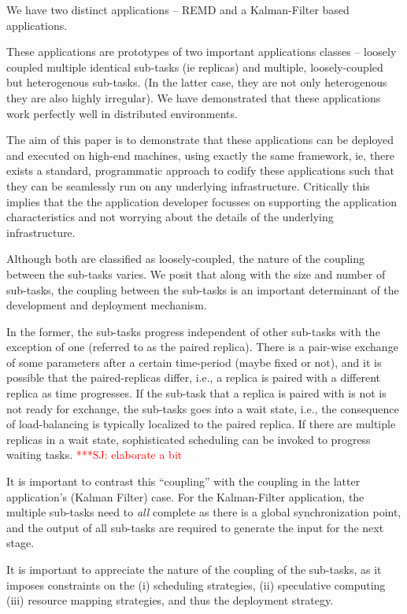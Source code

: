 \documentclass[conference,final]{IEEEtran}
\newcommand{\jhanote}[1]{ {\textcolor{red} { ***SJ: #1 }}}
\newcommand{\jhanote}[1]{}
\begin{document}
We have two distinct applications -- REMD and a Kalman-Filter based
applications.

These applications are prototypes of two important applications
classes -- loosely coupled multiple identical sub-tasks (ie replicas)
and multiple, loosely-coupled but heterogenous sub-tasks.  (In the
latter case, they are not only heterogenous they are also highly
irregular).  We have demonstrated that these applications work
perfectly well in distributed environments.

The aim of this paper is to demonstrate that these applications can be
deployed and executed on high-end machines, using exactly the same
framework, ie, there exists a standard, programmatic approach to
codify these applications such that they can be seamlessly run on any
underlying infrastructure. Critically this implies that the the
application developer focusses on supporting the application
characteristics and not worrying about the details of the underlying
infrastructure.

Although both are classified as loosely-coupled, the nature of the
coupling between the sub-tasks varies. We posit that along with the
size and number of sub-tasks, the coupling between the sub-tasks is an
important determinant of the development and deployment mechanism.

In the former, the sub-tasks
progress independent of other sub-tasks with the exception of one
(referred to as the paired replica). There is a pair-wise exchange of
some parameters after a certain time-period (maybe fixed or not), and
it is possible that the paired-replicas differ, i.e., a replica is
paired with a different replica as time progresses. If the sub-task
that a replica is paired with is not is not ready for exchange, the
sub-tasks goes into a wait state, i.e., the consequence of
load-balancing is typically localized to the paired replica. If there
are multiple replicas in a wait state, sophisticated scheduling can be
invoked to progress waiting tasks. \jhanote{elaborate a bit}

It is important to contrast this ``coupling'' with the coupling in the
latter application's (Kalman Filter) case. For the Kalman-Filter
application, the multiple sub-tasks need to {\it all} complete
as there is a global synchronization point, and the output
of all sub-tasks are required to generate the input for the next
stage.

It is important to appreciate the nature of the coupling of the
sub-tasks, as it imposes constraints on the (i) scheduling strategies,
(ii) speculative computing (iii) resource mapping strategies, and thus
the deployment strategy.
\end{document}
